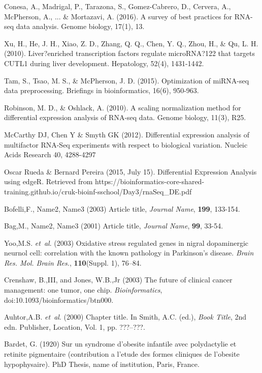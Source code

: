\documentclass{bioinfo}
\begin{document}
\begin{thebibliography}{}

Conesa, A., Madrigal, P., Tarazona, S., Gomez-Cabrero, D., Cervera, A., McPherson, A., ... \& Mortazavi, A. (2016). A survey of best practices for RNA-seq data analysis. Genome biology, 17(1), 13.

Xu, H., He, J. H., Xiao, Z. D., Zhang, Q. Q., Chen, Y. Q., Zhou, H., \& Qu, L. H. (2010). Liver?enriched transcription factors regulate microRNA?122 that targets CUTL1 during liver development. Hepatology, 52(4), 1431-1442.

 Tam, S., Tsao, M. S., \& McPherson, J. D. (2015). Optimization of miRNA-seq data preprocessing. Briefings in bioinformatics, 16(6), 950-963.

Robinson, M. D., \& Oshlack, A. (2010). A scaling normalization method for differential expression analysis of RNA-seq data. Genome biology, 11(3), R25.

McCarthy DJ, Chen Y \& Smyth GK (2012). Differential expression analysis of multifactor RNA-Seq experiments with respect to biological variation. Nucleic Acids Research 40, 4288-4297

Oscar Rueda \& Bernard Pereira (2015, July 15). Differential Expression Analysis using edgeR. Retrieved from https://bioinformatics-core-shared-training.github.io/cruk-bioinf-sschool/Day3/rnaSeq\_DE.pdf

Bofelli,F., Name2, Name3 (2003) Article title, {\it Journal Name}, {\bf 199}, 133-154.

Bag,M., Name2, Name3 (2001) Article title, {\it Journal Name}, {\bf 99}, 33-54.

Yoo,M.S. \textit{et~al}. (2003) Oxidative stress regulated genes
in nigral dopaminergic neurnol cell: correlation with the known
pathology in Parkinson's disease. \textit{Brain Res. Mol. Brain
Res.}, \textbf{110}(Suppl. 1), 76--84.

Crenshaw, B.,III, and Jones, W.B.,Jr (2003) The future of clinical
cancer management: one tumor, one chip. \textit{Bioinformatics},
doi:10.1093/bioinformatics/btn000.

Auhtor,A.B. \textit{et~al}. (2000) Chapter title. In Smith, A.C.
(ed.), \textit{Book Title}, 2nd edn. Publisher, Location, Vol. 1, pp.
???--???.

Bardet, G. (1920) Sur un syndrome d'obesite infantile avec
polydactylie et retinite pigmentaire (contribution a l'etude des
formes cliniques de l'obesite hypophysaire). PhD Thesis, name of
institution, Paris, France.

\end{thebibliography}
\end{document}

